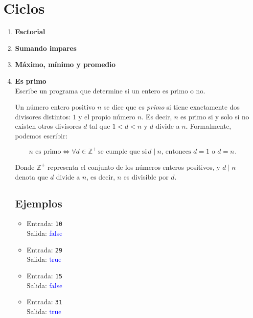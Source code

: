 \section{Ciclos}
\begin{enumerate}
    \item \textbf{Factorial}\\
    

    \item \textbf{Sumando impares}\\
    

    \item \textbf{Máximo, mínimo y promedio}\\
    

    \item \textbf{Es primo}\\
    Escribe un programa que determine si un entero es primo o no.
    
    Un número entero positivo \( n \) se dice que es \textit{primo} si tiene exactamente dos divisores distintos: \( 1 \) y el propio número \( n \). Es decir, \( n \) es primo si y solo si no existen otros divisores \( d \) tal que \( 1 < d < n \) y \( d \) divide a \( n \). Formalmente, podemos escribir:

    \[
    n \text{ es primo} \iff \forall d \in \mathbb{Z}^+ \, \text{se cumple que si} \, d \mid n \text{, entonces } d = 1 \text{ o } d = n.
    \]
    
    Donde \( \mathbb{Z}^+ \) representa el conjunto de los números enteros positivos, y \( d \mid n \) denota que \( d \) divide a \( n \), es decir, \( n \) es divisible por \( d \).
    \subsection*{Ejemplos}
    \begin{itemize}
        \item Entrada: \texttt{10}\\
              Salida: \textcolor{blue}{false}
        \item Entrada: \texttt{29}\\
              Salida: \textcolor{blue}{true}
        \item Entrada: \texttt{15}\\
              Salida: \textcolor{blue}{false}
        \item Entrada: \texttt{31}\\
              Salida: \textcolor{blue}{true}
    \end{itemize}


\end{enumerate}
